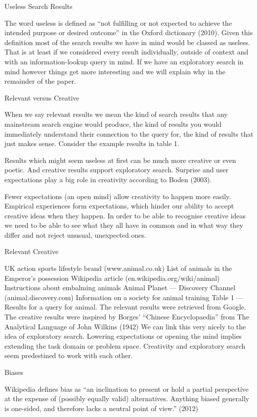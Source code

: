 Useless Search Results

The word useless is defined as ``not fulfilling or not expected to achieve the intended purpose or desired outcome'' in the Oxford dictionary (2010). Given this definition most of the search results we have in mind would be classed as useless. That is at least if we considered every result individually, outside of context and with an information-lookup query in mind. If we have an exploratory search in mind however things get more interesting and we will explain why in the remainder of the paper.

Relevant versus Creative

When we say relevant results we mean the kind of search results that any mainstream search engine would produce, the kind of results you would immediately understand their connection to the query for, the kind of results that just makes sense. Consider the example results in table 1.

Results which might seem useless at first can be much more creative or even poetic. And creative results support exploratory search. Surprise and user expectations play a big role in creativity according to Boden (2003).

Fewer expectations (an open mind) allow creativity to happen more easily. Empirical experiences form expectations, which hinder our ability to accept creative ideas when they happen. In order to be able to recognise creative ideas we need to be able to see what they all have in common and in what way they differ and not reject unusual, unexpected ones.

Relevant	Creative

UK action sports lifestyle brand
(www.animal.co.uk)	List of animals in the Emperor’s possession
Wikipedia article
(en.wikipedia.org/wiki/animal)	Instructions about embalming animals
Animal Planet --- Discovery Channel (animal.dis\-covery.com) 	Information on a society for animal training
Table 1 --- Results for a query for animal. The relevant results were retrieved from Google. The creative results were inspired by Borges’ “Chinese Encyclopaedia” from The Analytical Language of John Wilkins (1942)
We can link this very nicely to the idea of exploratory search. Lowering expectations or opening the mind implies extending the task domain or problem space. Creativity and exploratory search seem predestined to work with each other.

Biases

Wikipedia defines bias as ``an inclination to present or hold a partial perspective at the expense of (possibly equally valid) alternatives. Anything biased generally is one-sided, and therefore lacks a neutral point of view.'' (2012)

